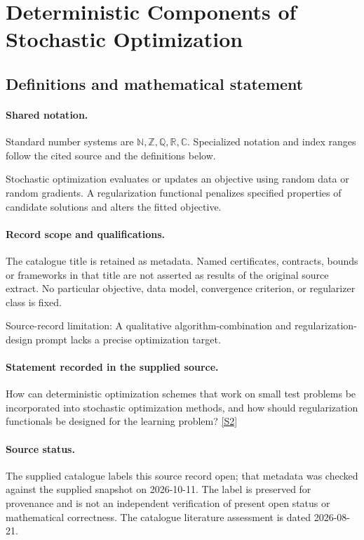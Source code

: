 \documentclass[11pt]{article}
\newcommand{\sref}[2]{\hyperlink{source:#1:#2}{[S#2]}}
\begin{document}
\section{Deterministic Components of Stochastic Optimization}\label{statement}

\subsection{Definitions and mathematical statement}

\paragraph{Shared notation.}Standard number systems are $\mathbb N,\mathbb Z,\mathbb Q,\mathbb R,\mathbb C$. Specialized notation and index ranges follow the cited source and the definitions below.


Stochastic optimization evaluates or updates an objective using random data or random gradients. A regularization functional penalizes specified properties of candidate solutions and alters the fitted objective.
\paragraph{Record scope and qualifications.}
The catalogue title is retained as metadata. Named certificates, contracts, bounds or frameworks in that title are not asserted as results of the original source extract.
No particular objective, data model, convergence criterion, or regularizer class is fixed.

Source-record limitation: A qualitative algorithm-combination and regularization-design prompt lacks a precise optimization target.
\paragraph{Statement recorded in the supplied source.}
How can deterministic optimization schemes that work on small test problems be incorporated into stochastic optimization methods, and how should regularization functionals be designed for the learning problem? \sref{statement}{2}
\paragraph{Source status.}
The supplied catalogue labels this source record open; that metadata was checked against the supplied snapshot on 2026-10-11. The label is preserved for provenance and is not an independent verification of present open status or mathematical correctness. The catalogue literature assessment is dated 2026-08-21.
\end{document}

